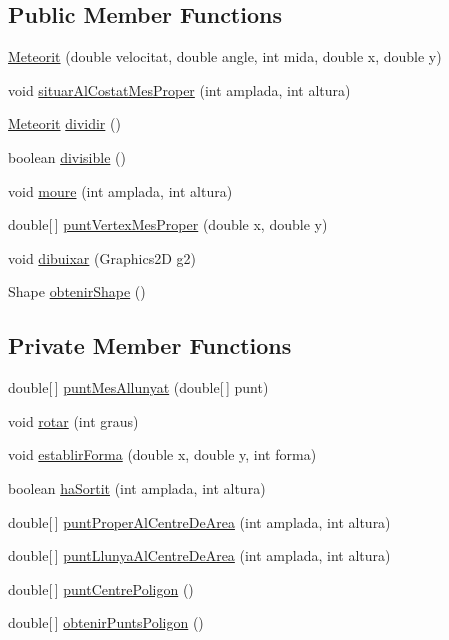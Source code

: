 \subsection*{Public Member Functions}
\begin{DoxyCompactItemize}
\item 
\hyperlink{class_meteorit_a9dcc96793a206baab2cc5aa5141a30f5}{Meteorit} (double velocitat, double angle, int mida, double x, double y)
\item 
void \hyperlink{class_meteorit_ab1e8e957f4ba216253d211523f2b3091}{situar\+Al\+Costat\+Mes\+Proper} (int amplada, int altura)
\item 
\hyperlink{class_meteorit}{Meteorit} \hyperlink{class_meteorit_aa4b891941b6ef30774a45d6965266170}{dividir} ()
\item 
boolean \hyperlink{class_meteorit_ab7f4539dc26a5026d8978918620db253}{divisible} ()
\item 
void \hyperlink{class_meteorit_af23ae6e1b16f750542711547cbe4957c}{moure} (int amplada, int altura)
\item 
double\mbox{[}$\,$\mbox{]} \hyperlink{class_meteorit_a685d6a89435a2fb03f1d8ebdeb70cb14}{punt\+Vertex\+Mes\+Proper} (double x, double y)
\item 
void \hyperlink{class_meteorit_a28f9530c5db8c8a192b272b8bd1114d2}{dibuixar} (Graphics2\+D g2)
\item 
Shape \hyperlink{class_meteorit_a31192464dbdc8e1bac9ae57c87ac6e2b}{obtenir\+Shape} ()
\end{DoxyCompactItemize}
\subsection*{Private Member Functions}
\begin{DoxyCompactItemize}
\item 
double\mbox{[}$\,$\mbox{]} \hyperlink{class_meteorit_a353fa1242e850f582f792605167e58e7}{punt\+Mes\+Allunyat} (double\mbox{[}$\,$\mbox{]} punt)
\item 
void \hyperlink{class_meteorit_a429daccf37f941ac0395a1838f0991a2}{rotar} (int graus)
\item 
void \hyperlink{class_meteorit_a0bc8468013d85caed1efe51b98397069}{establir\+Forma} (double x, double y, int forma)
\item 
boolean \hyperlink{class_meteorit_ac447d4590c8de8fd6153402a512adee2}{ha\+Sortit} (int amplada, int altura)
\item 
double\mbox{[}$\,$\mbox{]} \hyperlink{class_meteorit_ab63300b6281833f51f228bf8fb49c035}{punt\+Proper\+Al\+Centre\+De\+Area} (int amplada, int altura)
\item 
double\mbox{[}$\,$\mbox{]} \hyperlink{class_meteorit_aec4418bf83baf51641639ef97407b03f}{punt\+Llunya\+Al\+Centre\+De\+Area} (int amplada, int altura)
\item 
double\mbox{[}$\,$\mbox{]} \hyperlink{class_meteorit_a8d316ea738e82c4c9b2e02bc787e8bdc}{punt\+Centre\+Poligon} ()
\item 
double\mbox{[}$\,$\mbox{]} \hyperlink{class_meteorit_a237af5bb28238c5e76d1cea55b4457b6}{obtenir\+Punts\+Poligon} ()
\end{DoxyCompactItemize}
